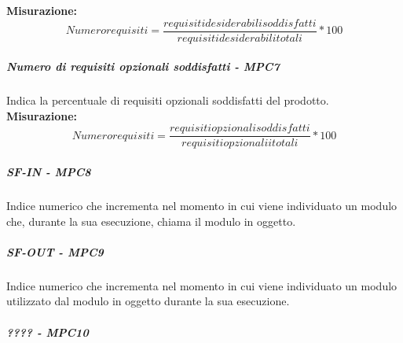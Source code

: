 \textbf{Misurazione:}\begin{equation}
Numero requisiti = \frac{requisiti desiderabili soddisfatti}{requisiti desiderabili totali} * 100
\end{equation}
\subparagraph{Numero di requisiti opzionali soddisfatti - MPC7}
Indica la percentuale di requisiti opzionali soddisfatti del prodotto.
\textbf{Misurazione:}\begin{equation}
Numero requisiti = \frac{requisiti opzionali soddisfatti}{requisiti opzionalii totali} * 100
\end{equation}
\subparagraph{SF-IN - MPC8}
Indice numerico che incrementa nel momento in cui viene individuato un modulo che, durante la sua esecuzione, chiama il modulo in oggetto.
\subparagraph{SF-OUT - MPC9}
Indice numerico che incrementa nel momento in cui viene individuato un modulo utilizzato dal modulo in oggetto durante la sua esecuzione.
\subparagraph{???? - MPC10}

